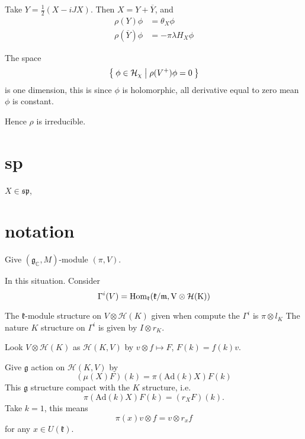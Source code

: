 \documentclass[12pt]{amsart}
\def\Hom{\rm{Hom}}
\def\bC{{\mathbb{C}}}
\def\sp{{\mathfrak{sp}}}
\def\Ad{{\rm Ad}}
\def\Ad{\mathrm{Ad}}
\def\fgg{\mathfrak{g}}
\def\fkk{\mathfrak{k}}
\def\chh{\mathcal{H}}
\def\fmm{\mathfrak{m}}
\begin{document}
Take $Y = \frac{1}{2}(X-iJX)$. Then $X = Y + \overline{Y}$, 
and 
\begin{align*}
\rho(Y) \phi &= \theta_X \phi \\
\rho(\overline{Y}) \phi &= -\pi \lambda H_X \phi
\end{align*}

The space 
\[
\Set{\phi \in \chh_\chi |\rho(V^+) \phi = 0}
\]
is one dimension, this is since $\phi$ is holomorphic, 
all derivative equal to zero mean $\phi$ is constant. 

Hence $\rho$ is irreducible. 

\section{sp}

$X\in \sp$, 
\section{notation}



Give $(\fgg_\bC, M)$-module $(\pi, V)$.

In this situation. 
Consider 
\[
\Gamma^i (V) = \Hom_{\fkk}(\fkk/\fmm, V\otimes \chh(K))
\]


The $\fkk$-module structure on $V\otimes \chh(K)$ given when compute the
$\Gamma^i$ is $\pi\otimes l_K$
The nature $K$ structure on $\Gamma^i$ is given by $I\otimes r_K$.

Look $V\otimes \chh(K)$ as $\chh(K, V)$ by $v\otimes f \mapsto F$, 
$F(k) = f(k)v$. 
 
Give $\fgg$ action on $\chh(K,V)$ by 
\[
(\mu(X)F)(k) = \pi(\Ad(k) X) F(k)
\]
This $\fgg$ structure compact with the $K$ structure, i.e. 
\[
\pi(\Ad(k) X) F(k) = (r_X F)(k).
\]
Take $k=1$, 
this means 
\[
\pi(x)v \otimes f = v \otimes r_x f
\]
for any $x\in U(\fkk)$.
\end{document}
